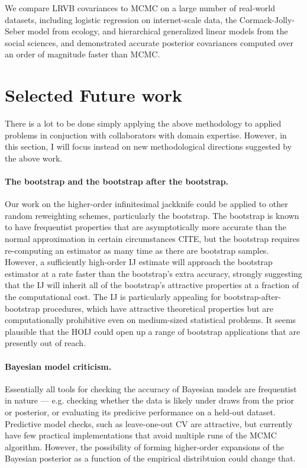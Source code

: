 We compare LRVB covariances to MCMC on a large number of real-world datasets,
including logistic regression on internet-scale data, the Cormack-Jolly-Seber
model from ecology, and hierarchical generalized linear models from the
social sciences, and demonstrated accurate posterior covariances computed
over an order of magnitude faster than MCMC.


\section{Selected Future work}

There is a lot to be done simply applying the above methodology to
applied problems in conjuction with collaborators with domain expertise.
However, in this section, I will focus instead on new methodological directions
suggested by the above work.

\paragraph{The bootstrap and the bootstrap after the bootstrap.}

Our work on the higher-order infinitesimal jackknife could be applied to other
random reweighting schemes, particularly the bootstrap.  The bootstrap is known
to have frequentist properties that are asymptotically more accurate than the
normal approximation in certain circumstances CITE, but the bootstrap requires
re-computing an estimator as many time as there are bootstrap samples. However,
a sufficiently high-order IJ estimate will approach the bootstrap estimator at a
rate faster than the bootstrap's extra accuracy, strongly suggesting that the IJ
will inherit all of the bootstrap's attractive properties at a fraction of the
computational cost.  The IJ is particularly appealing for
bootstrap-after-bootstrap procedures, which have attractive theoretical
properties but are computationally prohibitive even on medium-sized statistical
problems.  It seems plausible that the HOIJ could open up a range of bootstrap
applications that are presently out of reach.


\paragraph{Bayesian model criticism.}

Essentially all tools for checking the accuracy of Bayesian models are
frequentist in nature --- e.g. checking whether the data is likely under
draws from the prior or posterior, or evaluating its predicive performance
on a held-out dataset.  Predictive model checks, such as leave-one-out
CV are attractive, but currently have few practical implementations that
avoid multiple runs of the MCMC algorithm.  However, the possibility of
forming higher-order expansions of the Bayesian posterior as a function of
the empirical distribtuion could change that.


